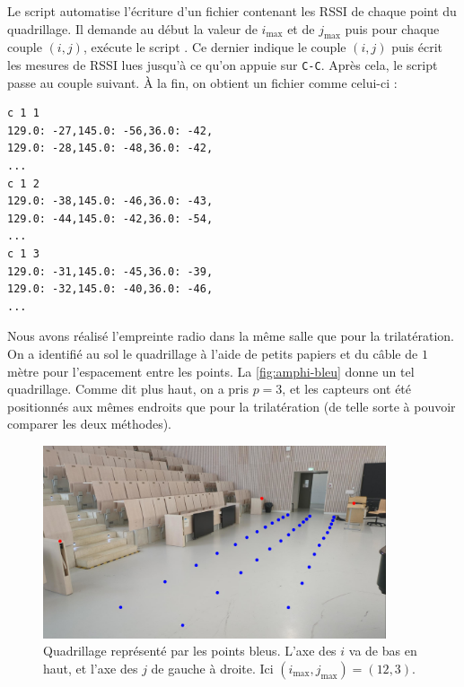 \documentclass[french, a4paper, 12pt, parskip]{scrartcl}
\begin{document}
Le script  automatise l'écriture d'un fichier
contenant les RSSI de chaque point du quadrillage. Il demande au début la valeur
de $i_{\max}$ et de $j_{\max}$ puis pour chaque couple $(i, j)$, exécute le
script . Ce dernier indique le couple $(i, j)$
puis écrit les mesures de RSSI lues jusqu'à ce qu'on appuie sur \verb+C-C+.
Après cela, le script passe au couple suivant. À la fin, on obtient un fichier
comme celui-ci :
\begin{verbatim}
c 1 1
129.0: -27,145.0: -56,36.0: -42,
129.0: -28,145.0: -48,36.0: -42,
...
c 1 2
129.0: -38,145.0: -46,36.0: -43,
129.0: -44,145.0: -42,36.0: -54,
...
c 1 3
129.0: -31,145.0: -45,36.0: -39,
129.0: -32,145.0: -40,36.0: -46,
...
\end{verbatim}

Nous avons réalisé l'empreinte radio dans la même salle que pour la
trilatération. On a identifié au sol le quadrillage à l'aide de petits papiers
et du câble de $1$ mètre pour l'espacement entre les points. La
\autoref{fig:amphi-bleu} donne un tel quadrillage. Comme dit plus haut, on a
pris $p=3$, et les capteurs ont été positionnés aux mêmes endroits que pour la
trilatération (de telle sorte à pouvoir comparer les deux méthodes).

\begin{figure}[h]
    \centering
    \includegraphics[width=0.9\textwidth]{amphi-bleu.jpeg}
    \caption{Quadrillage représenté par les points bleus. L'axe des $i$ va de
    bas en haut, et l'axe des $j$ de gauche à droite. Ici $(i_{\max}, j_{\max})
    = (12, 3)$.}
    \label{fig:amphi-bleu}
\end{figure}
\end{document}
